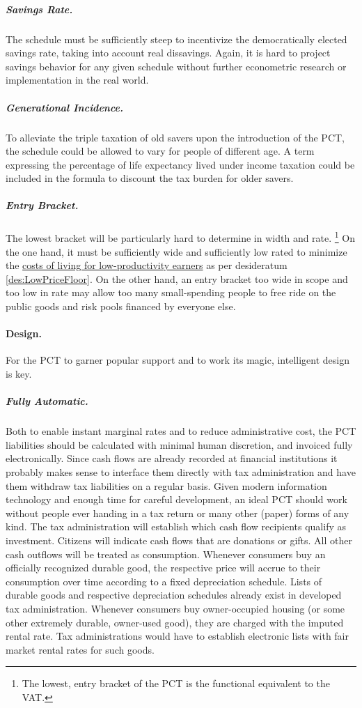 \subparagraph{Savings Rate.}
The schedule must be sufficiently steep to incentivize the democratically elected savings rate, taking into account real dissavings.
Again, it is hard to project savings behavior for any given schedule without further econometric research or implementation in the real world.

\subparagraph{Generational Incidence.}
To alleviate the triple taxation of old savers upon the introduction of the PCT, the schedule could be allowed to vary for people of different age.
A term expressing the percentage of life expectancy lived under income taxation could be included in the formula to discount the tax burden for older savers.

\subparagraph{Entry Bracket.}
The lowest bracket will be particularly hard to determine in width and rate.
\footnote{
	The lowest, entry bracket of the PCT is the functional equivalent to the VAT.
}
On the one hand, it must be sufficiently wide and sufficiently low rated to minimize the \hyperref[des:LowPriceFloor]{costs of living for low-productivity earners} as per desideratum \ref{des:LowPriceFloor}.
On the other hand, an entry bracket too wide in scope and too low in rate may allow too many small-spending people to free ride on the public goods and risk pools financed by everyone else.

\paragraph{Design.}
For the PCT to garner popular support and to work its magic, intelligent design is key.

\subparagraph{Fully Automatic.}
Both to enable instant marginal rates and to reduce administrative cost, the PCT liabilities should be calculated with minimal human discretion, and invoiced fully electronically.
Since cash flows are already recorded at financial institutions it probably makes sense to interface them directly with tax administration and have them withdraw tax liabilities on a regular basis.
Given modern information technology and enough time for careful development, an ideal PCT should work without people ever handing in a tax return or many other (paper) forms of any kind.
The tax administration will establish which cash flow recipients qualify as investment.
Citizens will indicate cash flows that are donations or gifts.
All other cash outflows will be treated as consumption.
Whenever consumers buy an officially recognized durable good, the respective price will accrue to their consumption over time according to a fixed depreciation schedule.
Lists of durable goods and respective depreciation schedules already exist in developed tax administration.
Whenever consumers buy owner-occupied housing (or some other extremely durable, owner-used good), they are charged with the imputed rental rate.
Tax administrations would have to establish electronic lists with fair market rental rates for such goods.

